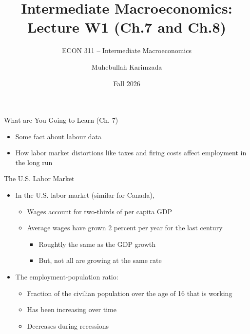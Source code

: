 \documentclass[aspectratio=1610]{beamer}
\title[Winter - Lecture 1] %
{Intermediate Macroeconomics: Lecture  W1 (Ch.7 and Ch.8)}
\subtitle{ECON 311 -- Intermediate Macroeconomics}
\author{Muhebullah Karimzada}
\institute{School of Economics \\\ University of Northern British Columbia}
\date{Fall 2026}
\begin{document}
\begin{frame}[plain]
  \titlepage
\end{frame}

\begin{frame}[wide]{What are You Going to Learn (Ch. 7)}
	\begin{itemize}
		\item Some fact about labour data
		\item How labor market distortions like taxes and ﬁring costs affect employment in the long run
	\end{itemize}
\end{frame}

\begin{frame}[wide]{The U.S. Labor Market}
	\begin{itemize}
		\item In the U.S. labor market (similar for Canada),
		\begin{itemize}
			\item Wages account for two-thirds of per capita GDP
			\item Average wages have grown 2 percent per year for the last century 
			\begin{itemize}
				\item Roughtly the same as the GDP growth
				\item But, not all are growing at the same rate
			\end{itemize}
		\end{itemize}
		\vspace{2mm}
		\item The employment-population ratio:
		\begin{itemize}
			\item Fraction of the civilian population over the age of 16 that is working
			\item Has been increasing over time
			\item Decreases during recessions
			
		\end{itemize}
	\end{itemize}
\end{frame}
\end{document}
